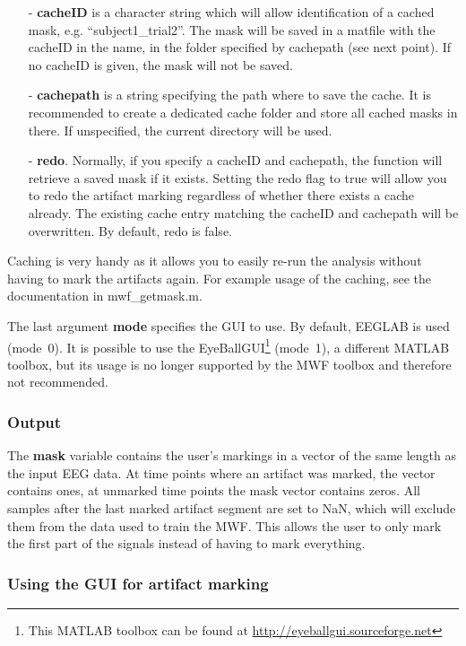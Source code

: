 \documentclass[11pt]{article}
\begin{document}
\begin{itemize}[noitemsep]
\item[-] \textbf{cacheID} is a character string which will allow identification of a cached mask, e.g. ``subject1\_trial2''. The mask will be saved in a matfile with the cacheID in the name, in the folder specified by cachepath (see next point). If no cacheID is given, the mask will not be saved.
\item[-] \textbf{cachepath} is a string specifying the path where to save the cache. It is recommended to create a dedicated cache folder and store all cached masks in there. If unspecified, the current directory will be used.
\item[-] \textbf{redo}. Normally, if you specify a cacheID and cachepath, the function will retrieve a saved mask if it exists. Setting the redo flag to true will allow you to redo the artifact marking regardless of whether there exists a cache already. The existing cache entry matching the cacheID and cachepath will be overwritten. By default, redo is false.
\end{itemize}

Caching is very handy as it allows you to easily re-run the analysis without having to mark the artifacts again. For example usage of the caching, see the documentation in mwf\_getmask.m.

The last argument \textbf{mode} specifies the GUI to use. By default, EEGLAB is used (mode~0). It is possible to use the EyeBallGUI\footnote{This MATLAB toolbox can be found at \url{http://eyeballgui.sourceforge.net}} (mode~1), a different MATLAB toolbox, but its usage is no longer supported by the MWF toolbox and therefore not recommended.

\subsubsection{Output}

The \textbf{mask} variable contains the user's markings in a vector of the same length as the input EEG data. At time points where an artifact was marked, the vector contains ones, at unmarked time points the mask vector contains zeros. All samples after the last marked artifact segment are set to NaN, which will exclude them from the data used to train the MWF. This allows the user to only mark the first part of the signals instead of having to mark everything.

\subsubsection{Using the GUI for artifact marking}
\end{document}
